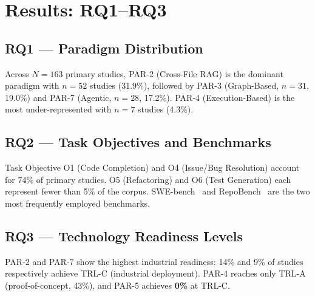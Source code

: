 \section{Results: RQ1--RQ3}\label{sec:results}

\subsection{RQ1 --- Paradigm Distribution}\label{sec:rq1}

Across $N=163$ primary studies, PAR-2 (Cross-File RAG) is the dominant
paradigm with $n=52$ studies (31.9\%), followed by PAR-3 (Graph-Based,
$n=31$, 19.0\%) and PAR-7 (Agentic, $n=28$, 17.2\%).  PAR-4
(Execution-Based) is the most under-represented with $n=7$ studies (4.3\%).

\subsection{RQ2 --- Task Objectives and Benchmarks}

Task Objective O1 (Code Completion) and O4 (Issue/Bug Resolution) account for
74\% of primary studies.  O5 (Refactoring) and O6 (Test Generation) each
represent fewer than 5\% of the corpus.  SWE-bench~\cite{jimenez2024swebench}
and RepoBench~\cite{liu2024repobench} are the two most frequently employed
benchmarks.

\subsection{RQ3 --- Technology Readiness Levels}\label{sec:rq3}

PAR-2 and PAR-7 show the highest industrial readiness: 14\% and 9\% of
studies respectively achieve TRL-C (industrial deployment).  PAR-4 reaches
only TRL-A (proof-of-concept, 43\%), and PAR-5 achieves \textbf{0\%} at
TRL-C.

